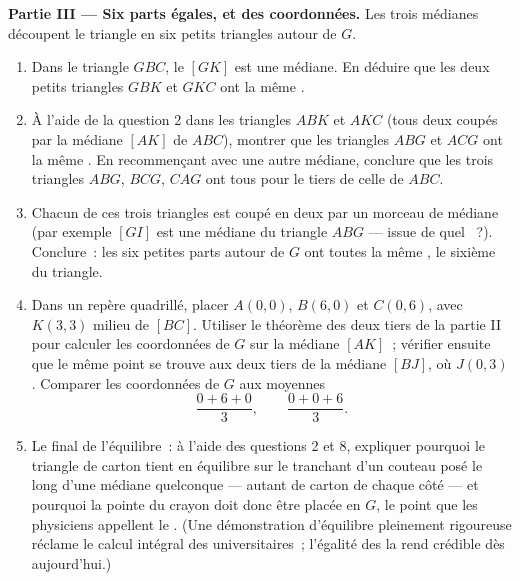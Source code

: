 \begin{problem}
\medskip
\noindent\textbf{Partie III --- Six parts égales, et des
coordonnées.}
Les trois médianes découpent le triangle en six petits triangles
autour de $G$.
\begin{enumerate}[resume]
  \item Dans le triangle $GBC$, le  $[GK]$ est une médiane.
        En déduire que les deux petits triangles $GBK$ et $GKC$ ont
        la même .
  \item À l'aide de la question 2 dans les triangles $ABK$ et $AKC$
        (tous deux coupés par la médiane $[AK]$ de $ABC$), montrer
        que les triangles $ABG$ et $ACG$ ont la même . En
        recommençant avec une autre médiane, conclure que les trois
        triangles $ABG$, $BCG$, $CAG$ ont tous pour  le tiers de
        celle de $ABC$.
  \item Chacun de ces trois triangles est coupé en deux par un
        morceau de médiane (par exemple $[GI]$ est une médiane du
        triangle $ABG$ --- issue de quel ~?). Conclure~: les
        six petites parts autour de $G$ ont toutes la même , le
        sixième du triangle.
  \item Dans un repère quadrillé, placer $A(0, 0)$, $B(6, 0)$ et
        $C(0, 6)$, avec $K(3, 3)$ milieu de $[BC]$. Utiliser le
        théorème des deux tiers de la partie II pour calculer les
        coordonnées de $G$ sur la médiane $[AK]$~; vérifier ensuite
        que le même point se trouve aux deux tiers de la médiane
        $[BJ]$, où $J(0, 3)$. Comparer les coordonnées de $G$ aux
        moyennes
        \[
        \frac{0 + 6 + 0}{3},
        \qquad
        \frac{0 + 0 + 6}{3} .
        \]
  \item Le final de l'équilibre~: à l'aide des questions 2 et 8,
        expliquer pourquoi le triangle de carton tient en équilibre
        sur le tranchant d'un couteau posé le long d'une médiane
        quelconque --- autant de carton de chaque côté --- et
        pourquoi la pointe du crayon doit donc être placée en $G$,
        le point que les physiciens appellent le .
        (Une démonstration d'équilibre pleinement rigoureuse
        réclame le calcul intégral des  universitaires~;
        l'égalité des  la rend crédible dès aujourd'hui.)
\end{enumerate}
\end{problem}
